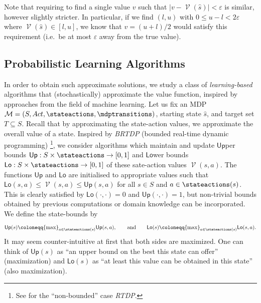 \documentclass{theoretics}
\newcommand{\MDP}{\mathcal{M}}
\newcommand{\States}{S}
\newcommand{\initialstate}{\hat{s}}
\newcommand{\Actions}{Act}
\DeclareMathOperator{\val}{\mathcal{V}}
\newcommand{\upperbound}{\mathsf{Up}}
\newcommand{\lowerbound}{\mathsf{Lo}}
\newcommand{\targetset}{T}
\begin{document}
Note that requiring to find a single value $v$ such that $|v - \val(\initialstate)| < \varepsilon$ is similar, however slightly stricter.
In particular, if we find $(l, u)$ with $0 \leq u - l < 2 \varepsilon$ where $\val(\initialstate) \in [l, u]$, we know that $v = (u + l) / 2$ would satisfy this requirement (i.e.\ be at most $\varepsilon$ away from the true value).

\subsection{Probabilistic Learning Algorithms} \label{sec:preliminaries:learning}
In order to obtain such approximate solutions, we study a class of \emph{learning-based} algorithms that (stochastically) approximate the value function, inspired by approaches from the field of machine learning.
Let us fix an MDP $\MDP = (\States, \Actions, \stateactions, \mdptransitions)$, starting state $\initialstate$, and target set $\targetset \subseteq \States$.
Recall that by approximating the state-action values, we approximate the overall value of a state.
Inspired by \emph{BRTDP} (bounded real-time dynamic programming) \cite{DBLP:conf/icml/McMahanLG05}\footnote{See \cite{DBLP:journals/ai/BartoBS95} for the \enquote{non-bounded} case \emph{RTDP}.}, we consider algorithms which maintain and update $\upperbound$per bounds $\upperbound : \States \times \stateactions \to [0, 1]$ and $\lowerbound$wer bounds $\lowerbound : \States \times \stateactions \to [0, 1]$ of these sate-action values $\val(s, a)$.
The functions $\upperbound$ and $\lowerbound$ are initialised to appropriate values such that $\lowerbound(s, a) \leq \val(s, a) \leq \upperbound(s, a)$ for all $s \in \States$ and $a \in \stateactions(s)$.
This is clearly satisfied by $\lowerbound(\cdot, \cdot) = 0$ and $\upperbound(\cdot, \cdot) = 1$, but non-trivial bounds obtained by previous computations or domain knowledge can be incorporated.
We define the state-bounds by
\begin{equation*}
	\upperbound(s) \coloneqq {\max}_{a \in \stateactions(s)} \upperbound(s, a), \qquad \text{and} \qquad \lowerbound(s) \coloneqq {\max}_{a \in \stateactions(s)} \lowerbound(s, a).
\end{equation*}
It may seem counter-intuitive at first that both sides are maximized.
One can think of $\upperbound(s)$ as \enquote{an upper bound on the best this state can offer} (maximization) and $\lowerbound(s)$ as \enquote{at least this value can be obtained in this state} (also maximization).
\end{document}
